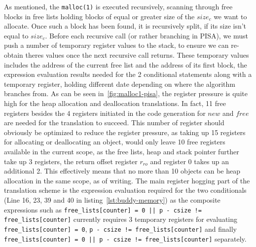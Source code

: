 As mentioned, the \texttt{malloc(1)} is executed recursively, scanning through free blocks in free lists holding blocks of equal or greater size of the $size_c$ we want to allocate. Once such a block has been found, it is recursively split, if its size isn't equal to $size_c$. Before each recursive call (or rather branching in PISA), we must push a number of temporary register values to the stack, to ensure we can re-obtain theres values once the next recursive call returns. These temporary values includes the address of the current free list and the address of its first block, the expression evaluation results needed for the 2 conditional statements along with a temporary register, holding different date depending on where the algorithm branches from. As can be seen in~\ref{fig:malloc1-pisa}, the register pressure is quite high for the heap allocation and deallocation translations. In fact, 11 free registers besides the 4 registers initiated in the code generation for $new$ and $free$ are needed for the translation to succeed. This number of register should obviously be optimized to reduce the register pressure, as taking up 15 registers for allocating or deallocating an object, would only leave 10 free registers available in the current scope, as the free lists, heap and stack pointer further take up 3 registers, the return offset register $r_{ro}$ and register 0 takes up an additional 2. This effectively means that no more than 10 objects can be heap allocation in the same scope, as of writing. The main register hogging part of the translation scheme is the expression evaluation required for the two conditionals (Line 16, 23, 39 and 40 in listing~\ref{lst:buddy-memory}) as the composite expressions such as \texttt{free\_lists[counter] = 0 || p - csize != free\_lists[counter]} currently requires 3 temporary registers for evaluating \texttt{free\_lists[counter] = 0}, \texttt{p - csize != free\_lists[counter]} and finally \texttt{free\_lists[counter] = 0 || p - csize != free\_lists[counter]} separately.  

